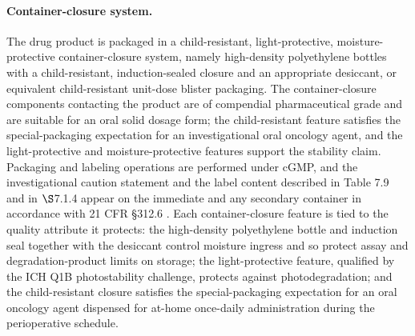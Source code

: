 \paragraph{Container-closure system.}
The drug product is packaged in a child-resistant, light-protective,
moisture-protective container-closure system, namely high-density polyethylene
bottles with a child-resistant, induction-sealed closure and an appropriate
desiccant, or equivalent child-resistant unit-dose blister packaging. The
container-closure components contacting the product are of compendial
pharmaceutical grade and are suitable for an oral solid dosage form; the
child-resistant feature satisfies the special-packaging expectation for an
investigational oral oncology agent, and the light-protective and
moisture-protective features support the stability claim. Packaging and labeling
operations are performed under cGMP, and the investigational caution statement and
the label content described in Table 7.9 and in $\S$7.1.4 appear on the immediate
and any secondary container in accordance with 21 CFR \S 312.6 \cite{phase1guidance}.
Each container-closure feature is tied to the quality attribute it protects: the
high-density polyethylene bottle and induction seal together with the desiccant
control moisture ingress and so protect assay and degradation-product limits on
storage; the light-protective feature, qualified by the ICH Q1B photostability
challenge, protects against photodegradation; and the child-resistant closure
satisfies the special-packaging expectation for an oral oncology agent dispensed
for at-home once-daily administration during the perioperative schedule.

